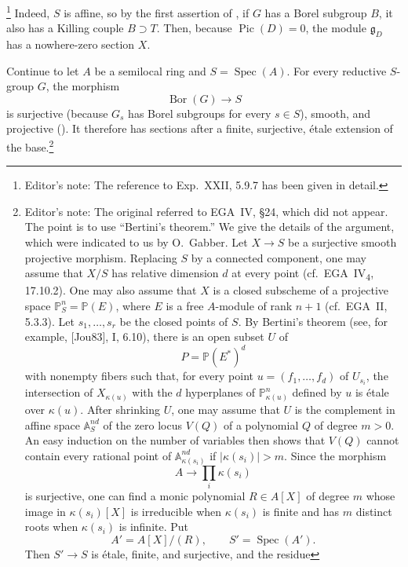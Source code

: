 \footnote{Editor's note: The reference to Exp.~XXII, 5.9.7 has been
given in detail.}
Indeed, \(S\) is affine, so by the first assertion of
, if \(G\) has a Borel subgroup \(B\), it also has a
Killing couple \(B\supset T\). Then, because
\(\operatorname{Pic}(D)=0\), the module \(\mathfrak g_D\) has a
nowhere-zero section \(X\).

Continue to let \(A\) be a semilocal ring and
\(S=\operatorname{Spec}(A)\). For every reductive \(S\)-group \(G\),
the morphism
\[
  \operatorname{Bor}(G)\longrightarrow S
\]
is surjective (because \(G_s\) has Borel subgroups for every
\(s\in S\)), smooth, and projective (). It therefore
has sections after a finite, surjective, étale extension of the
base.\footnote{Editor's note: The original referred to EGA~IV,
\S24, which did not appear. The point is to use ``Bertini's
theorem.'' We give the details of the argument, which were indicated
to us by O.\ Gabber. Let \(X\to S\) be a surjective smooth projective
morphism. Replacing \(S\) by a connected component, one may assume
that \(X/S\) has relative dimension \(d\) at every point
(cf.\ EGA~IV\textsubscript{4}, 17.10.2). One may also assume that
\(X\) is a closed subscheme of a projective space
\(\mathbb P^n_S=\mathbb P(E)\), where \(E\) is a free \(A\)-module
of rank \(n+1\) (cf.\ EGA~II, 5.3.3). Let
\(s_1,\ldots,s_r\) be the closed points of \(S\). By Bertini's
theorem (see, for example, \textup{[Jou83]}, I, 6.10), there is an
open subset \(U\) of
\[
  P=\mathbb P(E^\ast)^d
\]
with nonempty fibers such that, for every point
\(u=(f_1,\ldots,f_d)\) of \(U_{s_i}\), the intersection of
\(X_{\kappa(u)}\) with the \(d\) hyperplanes of
\(\mathbb P^n_{\kappa(u)}\) defined by \(u\) is étale over
\(\kappa(u)\). After shrinking \(U\), one may assume that \(U\) is
the complement in affine space \(\mathbb A^{nd}_S\) of the zero
locus \(V(Q)\) of a polynomial \(Q\) of degree \(m>0\). An easy
induction on the number of variables then shows that \(V(Q)\) cannot
contain every rational point of
\(\mathbb A^{nd}_{\kappa(s_i)}\) if
\(\lvert\kappa(s_i)\rvert>m\). Since the morphism
\[
  A\longrightarrow\prod_i\kappa(s_i)
\]
is surjective, one can find a monic polynomial \(R\in A[X]\) of
degree \(m\) whose image in \(\kappa(s_i)[X]\) is irreducible when
\(\kappa(s_i)\) is finite and has \(m\) distinct roots when
\(\kappa(s_i)\) is infinite. Put
\[
  A'=A[X]/(R),
  \qquad
  S'=\operatorname{Spec}(A').
\]
Then \(S'\to S\) is étale, finite, and surjective, and the residue
}
